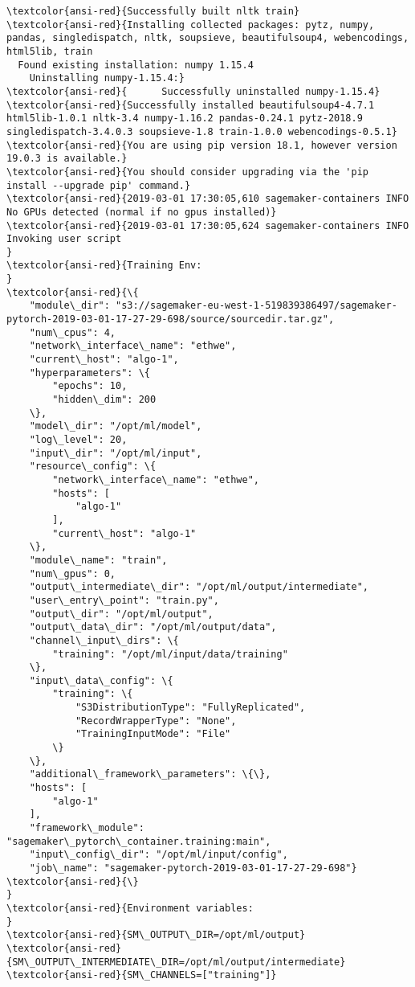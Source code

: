 \documentclass[11pt]{article}
\begin{document}
\begin{Verbatim}[commandchars=\\\{\}]
\textcolor{ansi-red}{Successfully built nltk train}
\textcolor{ansi-red}{Installing collected packages: pytz, numpy, pandas, singledispatch, nltk, soupsieve, beautifulsoup4, webencodings, html5lib, train
  Found existing installation: numpy 1.15.4
    Uninstalling numpy-1.15.4:}
\textcolor{ansi-red}{      Successfully uninstalled numpy-1.15.4}
\textcolor{ansi-red}{Successfully installed beautifulsoup4-4.7.1 html5lib-1.0.1 nltk-3.4 numpy-1.16.2 pandas-0.24.1 pytz-2018.9 singledispatch-3.4.0.3 soupsieve-1.8 train-1.0.0 webencodings-0.5.1}
\textcolor{ansi-red}{You are using pip version 18.1, however version 19.0.3 is available.}
\textcolor{ansi-red}{You should consider upgrading via the 'pip install --upgrade pip' command.}
\textcolor{ansi-red}{2019-03-01 17:30:05,610 sagemaker-containers INFO     No GPUs detected (normal if no gpus installed)}
\textcolor{ansi-red}{2019-03-01 17:30:05,624 sagemaker-containers INFO     Invoking user script
}
\textcolor{ansi-red}{Training Env:
}
\textcolor{ansi-red}{\{
    "module\_dir": "s3://sagemaker-eu-west-1-519839386497/sagemaker-pytorch-2019-03-01-17-27-29-698/source/sourcedir.tar.gz",
    "num\_cpus": 4,
    "network\_interface\_name": "ethwe",
    "current\_host": "algo-1",
    "hyperparameters": \{
        "epochs": 10,
        "hidden\_dim": 200
    \},
    "model\_dir": "/opt/ml/model",
    "log\_level": 20,
    "input\_dir": "/opt/ml/input",
    "resource\_config": \{
        "network\_interface\_name": "ethwe",
        "hosts": [
            "algo-1"
        ],
        "current\_host": "algo-1"
    \},
    "module\_name": "train",
    "num\_gpus": 0,
    "output\_intermediate\_dir": "/opt/ml/output/intermediate",
    "user\_entry\_point": "train.py",
    "output\_dir": "/opt/ml/output",
    "output\_data\_dir": "/opt/ml/output/data",
    "channel\_input\_dirs": \{
        "training": "/opt/ml/input/data/training"
    \},
    "input\_data\_config": \{
        "training": \{
            "S3DistributionType": "FullyReplicated",
            "RecordWrapperType": "None",
            "TrainingInputMode": "File"
        \}
    \},
    "additional\_framework\_parameters": \{\},
    "hosts": [
        "algo-1"
    ],
    "framework\_module": "sagemaker\_pytorch\_container.training:main",
    "input\_config\_dir": "/opt/ml/input/config",
    "job\_name": "sagemaker-pytorch-2019-03-01-17-27-29-698"}
\textcolor{ansi-red}{\}
}
\textcolor{ansi-red}{Environment variables:
}
\textcolor{ansi-red}{SM\_OUTPUT\_DIR=/opt/ml/output}
\textcolor{ansi-red}{SM\_OUTPUT\_INTERMEDIATE\_DIR=/opt/ml/output/intermediate}
\textcolor{ansi-red}{SM\_CHANNELS=["training"]}

\end{Verbatim}
\end{document}
